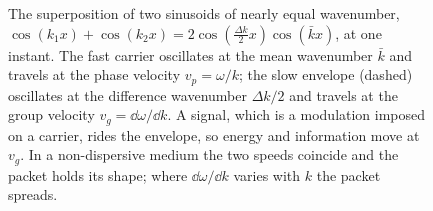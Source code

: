 \begin{figure}[htbp]
\centering
{}
\caption[A two-tone wave packet, carrier and envelope]{The superposition
of two sinusoids of nearly equal wavenumber, $\cos(k_1 x) + \cos(k_2 x) =
2\cos(\tfrac{\Delta k}{2}x)\cos(\bar k x)$, at one instant. The fast
carrier oscillates at the mean wavenumber $\bar k$ and travels at the
phase velocity $v_p = \omega/k$; the slow envelope (dashed) oscillates at
the difference wavenumber $\Delta k/2$ and travels at the group velocity
$v_g = \dd\omega/\dd k$. A signal, which is a modulation imposed on a
carrier, rides the envelope, so energy and information move at $v_g$. In a
non-dispersive medium the two speeds coincide and the packet holds its
shape; where $\dd\omega/\dd k$ varies with $k$ the packet spreads.}
\label{fig:vol04ch10:wave-packet}
\end{figure}
